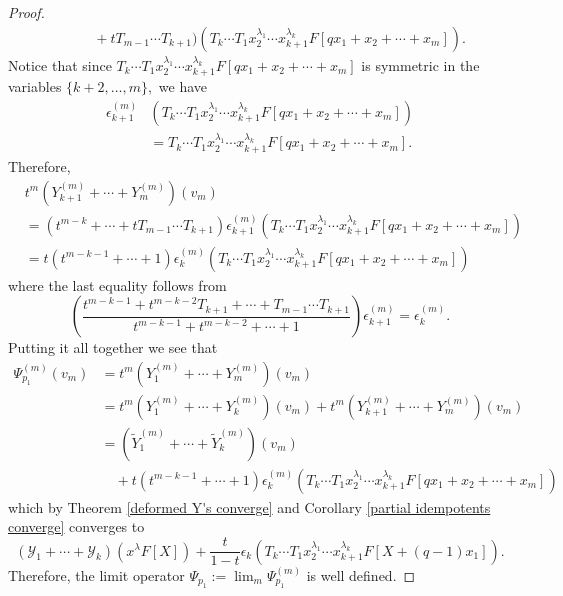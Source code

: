 \documentclass[11pt]{article}
\theoremstyle{definition}
\numberwithin{equation}{section}
\newcommand{\y}{{ \mathscr{Y} }}
\begin{document}
\begin{proof}
\begin{align*}
          & \qquad + tT_{m-1}\cdots T_{k+1}) \left( T_{k}\cdots T_1x_2^{\lambda_1}\cdots x_{k+1}^{\lambda_{k}}F[qx_1+x_2+ \cdots + x_m] \right).
    \end{align*}
Notice that since $T_{k}\cdots T_1x_2^{\lambda_1}\cdots x_{k+1}^{\lambda_{k}}F[qx_1+x_2+ \cdots + x_m]$ is symmetric in the variables $\{k+2,\ldots,m\},$ we have
\begin{align*}
\epsilon_{k+1}^{(m)}&(T_{k}\cdots T_1x_2^{\lambda_1}\cdots x_{k+1}^{\lambda_{k}}F[qx_1+x_2+ \cdots + x_m]) \\
&= T_{k}\cdots T_1x_2^{\lambda_1}\cdots x_{k+1}^{\lambda_{k}}F[qx_1+x_2+ \cdots + x_m].
\end{align*}
Therefore, 
\begin{align*}
    &t^m(Y_{k+1}^{(m)}+ \cdots + Y_{m}^{(m)})(v_m) \\
    &= (t^{m-k}+\cdots+ tT_{m-1}\cdots T_{k+1})\epsilon_{k+1}^{(m)}(T_{k}\cdots T_1x_2^{\lambda_1}\cdots x_{k+1}^{\lambda_{k}}F[qx_1+x_2+ \cdots + x_m]) \\
    &= t(t^{m-k-1}+ \cdots + 1)\epsilon_{k}^{(m)}(T_{k}\cdots T_1x_2^{\lambda_1}\cdots x_{k+1}^{\lambda_{k}}F[qx_1+x_2+ \cdots + x_m])
\end{align*}
where the last equality follows from 
$$\left( \frac{t^{m-k-1}+ t^{m-k-2}T_{k+1}+\cdots+ T_{m-1}\cdots T_{k+1}}{t^{m-k-1}+ t^{m-k-2}+\cdots + 1} \right) \epsilon_{k+1}^{(m)} = \epsilon_{k}^{(m)}.$$ 
Putting it all together we see that 
\begin{align*}
    \Psi_{p_1}^{(m)}(v_m) &= t^m(Y_1^{(m)}+\cdots+Y_m^{(m)})(v_m) \\
    &= t^m(Y_1^{(m)}+\cdots+Y_k^{(m)})(v_m) + t^m(Y_{k+1}^{(m)}+\cdots+Y_m^{(m)})(v_m) \\
    &= (\widetilde{Y}_{1}^{(m)}+ \cdots + \widetilde{Y}_{k}^{(m)})(v_m) \\
    & \quad + t(t^{m-k-1}+ \cdots + 1)\epsilon_{k}^{(m)}(T_{k}\cdots T_1x_2^{\lambda_1}\cdots x_{k+1}^{\lambda_{k}}F[qx_1+x_2+ \cdots + x_m])
\end{align*}
which by Theorem \ref{deformed Y's converge} and Corollary \ref{partial idempotents converge} converges to 
$$(\y_1+ \cdots + \y_k)(x^{\lambda}F[X]) + \frac{t}{1-t}\epsilon_{k}(T_k\cdots T_1x_2^{\lambda_1}\cdots x_{k+1}^{\lambda_k}F[X+(q-1)x_1]) .$$ Therefore, the limit operator $\Psi_{p_1}:= \lim_{m} \Psi_{p_1}^{(m)}$ is well defined. 


\end{proof}
\end{document}
